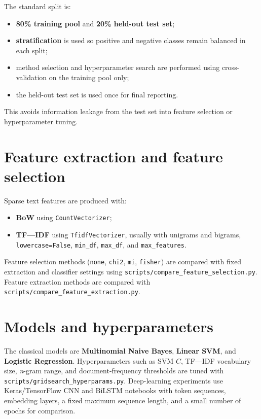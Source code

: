 \documentclass[11pt,a4paper]{report}
\begin{document}
The standard split is:
\begin{itemize}[noitemsep]
    \item \textbf{80\% training pool} and \textbf{20\% held-out test set};
    \item \textbf{stratification} is used so positive and negative classes remain balanced in each split;
    \item method selection and hyperparameter search are performed using cross-validation on the training pool only;
    \item the held-out test set is used once for final reporting.
\end{itemize}
This avoids information leakage from the test set into feature selection or hyperparameter tuning.

\section{Feature extraction and feature selection}

Sparse text features are produced with:
\begin{itemize}[noitemsep]
    \item \textbf{BoW} using \texttt{CountVectorizer};
    \item \textbf{TF---IDF} using \texttt{TfidfVectorizer}, usually with unigrams and bigrams, \texttt{lowercase=False}, \texttt{min\_df}, \texttt{max\_df}, and \texttt{max\_features}.
\end{itemize}
Feature selection methods (\texttt{none}, \texttt{chi2}, \texttt{mi}, \texttt{fisher}) are compared with fixed extraction and classifier settings using \texttt{scripts/compare\_feature\_selection.py}. Feature extraction methods are compared with \texttt{scripts/compare\_feature\_extraction.py}.

\section{Models and hyperparameters}

The classical models are \textbf{Multinomial Naive Bayes}, \textbf{Linear SVM}, and \textbf{Logistic Regression}. Hyperparameters such as SVM $C$, TF---IDF vocabulary size, \textit{n}-gram range, and document-frequency thresholds are tuned with \texttt{scripts/gridsearch\_hyperparams.py}. Deep-learning experiments use Keras/TensorFlow CNN and BiLSTM notebooks with token sequences, embedding layers, a fixed maximum sequence length, and a small number of epochs for comparison.
\end{document}
